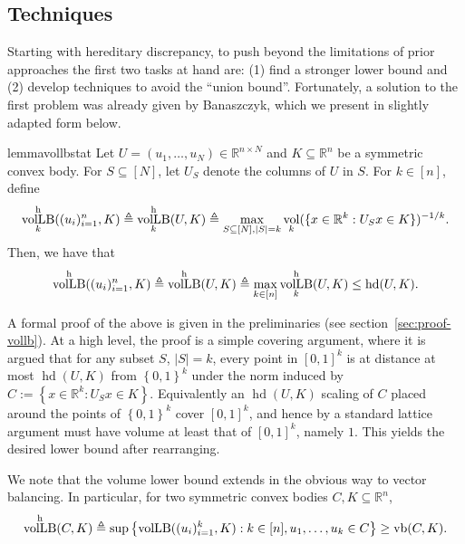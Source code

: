 \documentclass[11pt]{article}
\newcommand{\R}{{\mathbb{R}}}
\newcommand{\eqdef}{\triangleq}
\newcommand{\set}[1]{\left\{ #1 \right\}}
\DeclareMathOperator{\vollb}{volLB}
\DeclareMathOperator{\hd}{hd}
\DeclareMathOperator{\vb}{vb}
\DeclareMathOperator{\vol}{vol}
\begin{document}
\subsection{Techniques}

Starting with hereditary discrepancy, to push beyond the limitations of prior
approaches the first two tasks at hand are: (1) find a stronger lower bound and
(2) develop techniques to avoid the ``union bound''. Fortunately, a solution to the
first problem was already given by Banaszczyk\cite{Bana93}, which we present in
slightly adapted form below.

\begin{restatable}{lemma}{vollbstat} 
\label{lem:vol-lb}
Let $U=(u_1,\dots,u_N) \in \R^{n \times N}$ and $K \subseteq \R^n$ be a
symmetric convex body. For $S \subseteq [N]$, let $U_S$ denote the columns
of $U$ in $S$. For $k \in [n]$, define 
\begin{equation}
\label{eq:vol-lb}
\vollb^{\rm h}_k((u_i)_{i=1}^n,K) \eqdef \vollb^{\rm h}_k(U, K) \eqdef
\max_{S \subseteq [N],|S|=k} \vol_k(\{x \in \R^k: U_S x \in K\})^{-1/k}.
\end{equation}
Then, we have that
\begin{equation}
\label{eq:vol-lbh}
\vollb^{\rm h}((u_i)_{i=1}^n,K) \eqdef \vollb^{\rm h}(U,K) \eqdef \max_{k \in [n]} \vollb^{\rm h}_k(U,K) \leq \hd(U,K). 
\end{equation}
\end{restatable}

A formal proof of the above is given in the preliminaries (see
section~\ref{sec:proof-vollb}). At a high level, the proof is a simple covering
argument, where it is argued that for any subset $S$, $|S|=k$, every point in
$[0,1]^k$ is at distance at most $\hd(U,K)$ from $\set{0,1}^k$ under the norm
induced by $C := \set{x \in \R^k: U_S x \in K}$. Equivalently an $\hd(U,K)$
scaling of $C$ placed around the points of $\set{0,1}^k$ cover $[0,1]^k$, and
hence by a standard lattice argument must have volume at least that of
$[0,1]^k$, namely $1$. This yields the desired lower bound after rearranging. 

We note that the volume lower bound extends in the obvious way to vector
balancing. In particular, for two symmetric convex bodies $C,K \subseteq \R^n$,
\begin{equation}
\label{eq:vol-lb-vb}
\vollb^{\rm h}(C,K) \eqdef \sup \set{\vollb((u_i)_{i=1}^k,K):k \in [n],
u_1,\dots,u_k \in C} \geq \vb(C,K).
\end{equation}
\end{document}
